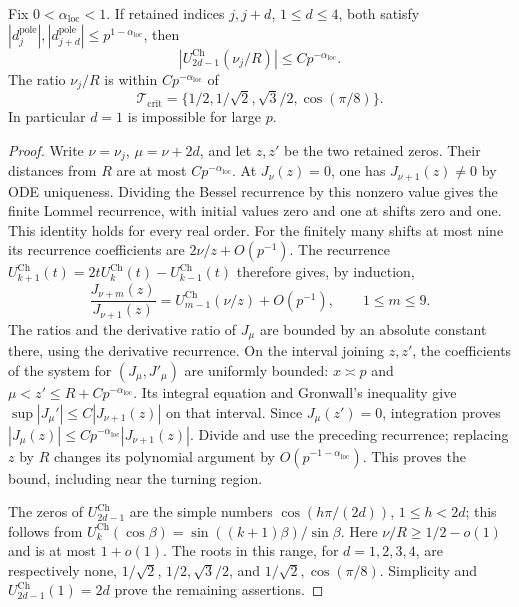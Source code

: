 \begin{lemma}
\label{inf:lommel-resonance}
Fix $0<\alpha_{\mathrm{loc}}<1$. If retained indices $j,j+d$,
$1\le d\le4$, both satisfy
$|d_j^{\mathrm{pole}}|,|d_{j+d}^{\mathrm{pole}}|\le p^{1-\alpha_{\mathrm{loc}}}$,
then
\[
 |U_{2d-1}^{\mathrm{Ch}}(\nu_j/R)|\le Cp^{-\alpha_{\mathrm{loc}}}.
\]
The ratio $\nu_j/R$ is within $Cp^{-\alpha_{\mathrm{loc}}}$ of
\begin{equation}\label{inf:critical-ratios}
 \mathcal T_{\mathrm{crit}}=
 \{1/2,1/\sqrt2,\sqrt3/2,\cos(\pi/8)\}.
\end{equation}
In particular $d=1$ is impossible for large $p$.
\end{lemma}
\begin{proof}
Write $\nu=\nu_j$, $\mu=\nu+2d$, and let $z,z'$ be the two retained
zeros. Their distances from $R$ are at most $Cp^{-\alpha_{\mathrm{loc}}}$.
At $J_\nu(z)=0$, one has $J_{\nu+1}(z)\ne0$ by ODE uniqueness.
Dividing the Bessel recurrence by this nonzero value gives the
finite Lommel recurrence, with initial values zero and one at
shifts zero and one. This identity holds for every real order.
For the finitely many shifts at most nine its recurrence coefficients
are $2\nu/z+O(p^{-1})$. The recurrence
$U_{k+1}^{\mathrm{Ch}}(t)=2tU_k^{\mathrm{Ch}}(t)-U_{k-1}^{\mathrm{Ch}}(t)$
therefore gives, by induction,
\[
 \frac{J_{\nu+m}(z)}{J_{\nu+1}(z)}
 =U_{m-1}^{\mathrm{Ch}}(\nu/z)+O(p^{-1}),\qquad 1\le m\le9.
\]
The ratios and the derivative ratio of $J_\mu$ are bounded by an
absolute constant there, using the derivative recurrence.
On the interval joining $z,z'$, the coefficients of the system for
$(J_\mu,J'_{\mu})$ are uniformly bounded: $x\asymp p$ and
$\mu<z'\le R+Cp^{-\alpha_{\mathrm{loc}}}$.
Its integral equation and Gronwall's inequality give
$\sup|J_\mu'|\le C|J_{\nu+1}(z)|$ on that interval.
Since $J_\mu(z')=0$, integration proves
$|J_\mu(z)|\le Cp^{-\alpha_{\mathrm{loc}}}|J_{\nu+1}(z)|$.
Divide and use the preceding recurrence; replacing $z$ by $R$
changes its polynomial argument by $O(p^{-1-\alpha_{\mathrm{loc}}})$.
This proves the bound, including near the turning region.

The zeros of $U_{2d-1}^{\mathrm{Ch}}$ are the simple numbers
$\cos(h\pi/(2d))$, $1\le h<2d$; this follows from
$U_k^{\mathrm{Ch}}(\cos\beta)=\sin((k+1)\beta)/\sin\beta$.
Here $\nu/R\ge1/2-o(1)$ and is at most $1+o(1)$.
The roots in this range, for $d=1,2,3,4$, are respectively
none, $1/\sqrt2$, $1/2,\sqrt3/2$, and
$1/\sqrt2,\cos(\pi/8)$. Simplicity and
$U_{2d-1}^{\mathrm{Ch}}(1)=2d$ prove the remaining assertions.
\end{proof}


